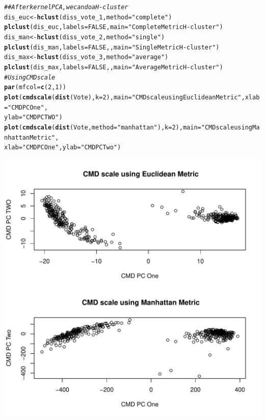 \documentclass{article}\usepackage[]{graphicx}\usepackage[]{color}
\makeatletter
\def\maxwidth{ %
  \ifdim\Gin@nat@width>\linewidth
    \linewidth
  \else
    \Gin@nat@width
  \fi
}
\newcommand{\hlnum}[1]{\textcolor[rgb]{0.686,0.059,0.569}{#1}}%
\newcommand{\hlstr}[1]{\textcolor[rgb]{0.192,0.494,0.8}{#1}}%
\newcommand{\hlcom}[1]{\textcolor[rgb]{0.678,0.584,0.686}{\textit{#1}}}%
\newcommand{\hlstd}[1]{\textcolor[rgb]{0.345,0.345,0.345}{#1}}%
\newcommand{\hlkwb}[1]{\textcolor[rgb]{0.69,0.353,0.396}{#1}}%
\newcommand{\hlkwc}[1]{\textcolor[rgb]{0.333,0.667,0.333}{#1}}%
\newcommand{\hlkwd}[1]{\textcolor[rgb]{0.737,0.353,0.396}{\textbf{#1}}}%
\newenvironment{kframe}{%
 \def\at@end@of@kframe{}%
 \ifinner\ifhmode%
  \def\at@end@of@kframe{\end{minipage}}%
  \begin{minipage}{\columnwidth}%
 \fi\fi%
 \def\FrameCommand##1{\hskip\@totalleftmargin \hskip-\fboxsep
 \colorbox{shadecolor}{##1}\hskip-\fboxsep
     \hskip-\linewidth \hskip-\@totalleftmargin \hskip\columnwidth}%
 \MakeFramed {\advance\hsize-\width
   \@totalleftmargin\z@ \linewidth\hsize
   \@setminipage}}%
 {\par\unskip\endMakeFramed%
 \at@end@of@kframe}
\newenvironment{knitrout}{}{} %
\makeatother
\begin{document}
\begin{knitrout}
\begin{kframe}\begin{alltt}
\hlcom{## After kernel PCA, we can do a H-cluster}
\hlstd{dis_euc} \hlkwb{<-} \hlkwd{hclust}\hlstd{(diss_vote_1,} \hlkwc{method} \hlstd{=} \hlstr{"complete"}\hlstd{)}
\hlkwd{plclust}\hlstd{(dis_euc,} \hlkwc{labels} \hlstd{=} \hlnum{FALSE}\hlstd{,} \hlkwc{main} \hlstd{=} \hlstr{"Complete Metric H-cluster"}\hlstd{)}
\hlstd{dis_man} \hlkwb{<-} \hlkwd{hclust}\hlstd{(diss_vote_2,} \hlkwc{method} \hlstd{=} \hlstr{"single"}\hlstd{)}
\hlkwd{plclust}\hlstd{(dis_man,} \hlkwc{labels} \hlstd{=} \hlnum{FALSE}\hlstd{, ,} \hlkwc{main} \hlstd{=} \hlstr{"Single Metric H-cluster"}\hlstd{)}
\hlstd{dis_max} \hlkwb{<-} \hlkwd{hclust}\hlstd{(diss_vote_3,} \hlkwc{method} \hlstd{=} \hlstr{"average"}\hlstd{)}
\hlkwd{plclust}\hlstd{(dis_max,} \hlkwc{labels} \hlstd{=} \hlnum{FALSE}\hlstd{, ,} \hlkwc{main} \hlstd{=} \hlstr{"Average Metric H-cluster"}\hlstd{)}
\hlcom{# Using CMDscale}
\hlkwd{par}\hlstd{(}\hlkwc{mfcol} \hlstd{=} \hlkwd{c}\hlstd{(}\hlnum{2}\hlstd{,} \hlnum{1}\hlstd{))}
\hlkwd{plot}\hlstd{(}\hlkwd{cmdscale}\hlstd{(}\hlkwd{dist}\hlstd{(Vote),} \hlkwc{k} \hlstd{=} \hlnum{2}\hlstd{),} \hlkwc{main} \hlstd{=} \hlstr{" CMD scale using Euclidean Metric"}\hlstd{,} \hlkwc{xlab} \hlstd{=} \hlstr{"CMD PC One"}\hlstd{,}
    \hlkwc{ylab} \hlstd{=} \hlstr{"CMD PC TWO"}\hlstd{)}
\hlkwd{plot}\hlstd{(}\hlkwd{cmdscale}\hlstd{(}\hlkwd{dist}\hlstd{(Vote,} \hlkwc{method} \hlstd{=} \hlstr{"manhattan"}\hlstd{),} \hlkwc{k} \hlstd{=} \hlnum{2}\hlstd{),} \hlkwc{main} \hlstd{=} \hlstr{" CMD scale using Manhattan Metric"}\hlstd{,}
    \hlkwc{xlab} \hlstd{=} \hlstr{"CMD PC One"}\hlstd{,} \hlkwc{ylab} \hlstd{=} \hlstr{"CMD PC Two"}\hlstd{)}
\end{alltt}
\end{kframe}
\includegraphics[width=\maxwidth]{figure/minimal-Problem_One3} 

\end{knitrout}
\end{document}
